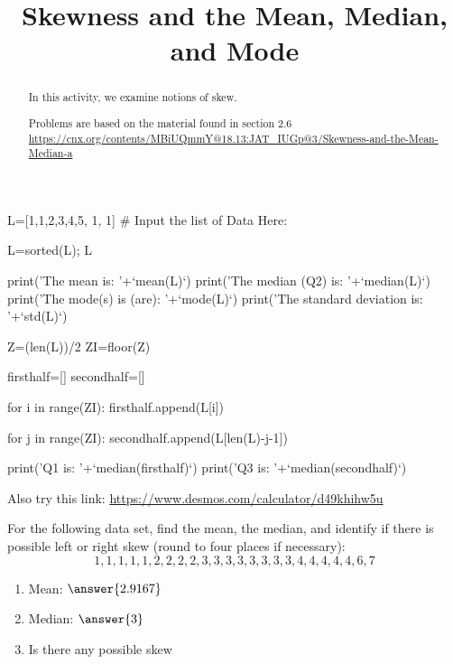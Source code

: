 \documentclass{ximera}
\title{Skewness and the Mean, Median, and Mode}
\begin{document}
      
\begin{abstract}
      
In this activity, we examine notions of skew.

Problems are based on the material found in section 2.6 \url{https://cnx.org/contents/MBiUQmmY@18.13:JAT_IUGp@3/Skewness-and-the-Mean-Median-a}
      
\end{abstract}
      
\maketitle
 
 \begin{sageCell}
L=[1,1,2,3,4,5, 1, 1] # Input the list of Data Here:

L=sorted(L); L


print('The mean is: '+`mean(L)`)
print('The median (Q2) is: '+`median(L)`)
print('The mode(s) is (are): '+`mode(L)`)
print('The standard deviation is: '+`std(L)`)

Z=(len(L))/2
ZI=floor(Z)

firsthalf=[]
secondhalf=[]

for i in range(ZI):
    firsthalf.append(L[i])

    
for j in range(ZI):
    secondhalf.append(L[len(L)-j-1])


print('Q1 is: '+`median(firsthalf)`)
print('Q3 is: '+`median(secondhalf)`)
\end{sageCell} 
     
Also try this link: \url{https://www.desmos.com/calculator/d49khihw5u}   
     
 
\begin{problem}
For the following data set, find the mean, the median, and identify if there is possible left or right skew (round to four places if necessary):
$$1,1,1,1,1,2,2,2,2,3,3,3,3,3,3,3,3,4,4,4,4,4,6,7$$

\begin{enumerate}
\item Mean: $\answer{2.9167}$
\item Median: $\answer{3}$
\item Is there any possible skew
\begin{multipleChoice}
\end{multipleChoice}

\end{enumerate}


\end{problem}
\end{document}
